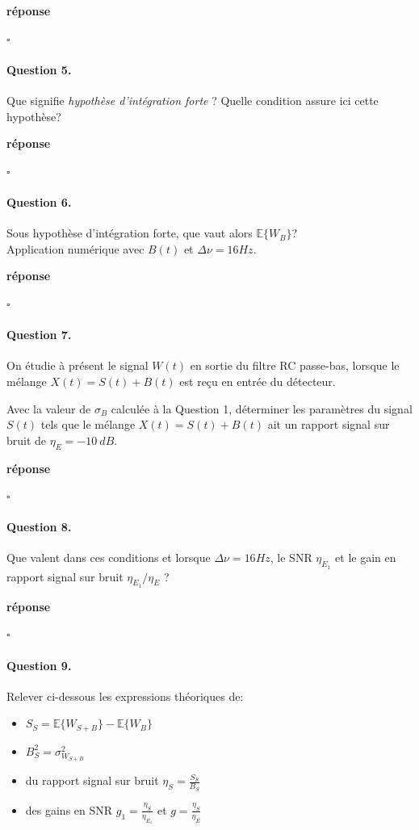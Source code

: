 \documentclass{article}
\newcommand{\dnu}{16}
\newcommand{\debutrep}[1]{\color{blue}\begin{center} \hrulefill \textbf{ #1 } \hrulefill \end{center} }
\newcommand{\finrep}{\vspace*{5mm}\hfill $\square$\color{black}\vspace*{5mm}}
\begin{document}
\debutrep{réponse}

\finrep

\paragraph{Question 5.}
Que signifie {\em hypothèse d'intégration forte} ? Quelle condition assure ici cette hypothèse?

\debutrep{réponse}

\finrep

 \paragraph{Question 6.}
Sous hypothèse d'intégration forte, que vaut  alors $\mathbb{E}\{W_B\}$? \\
Application numérique avec $B(t)$ et $\Delta\nu = \dnu Hz$.

\debutrep{réponse}

\finrep

\paragraph{Question 7.}
On étudie à présent le signal $W(t)$ en sortie du filtre RC passe-bas, lorsque le mélange $X(t) = S(t) + B(t)$ est reçu en entrée du détecteur.

Avec la valeur de $\sigma_B$ calculée à la Question 1, déterminer les paramètres du signal $S(t)$ tels que le mélange $X(t) = S(t)+B(t)$ ait un rapport signal sur bruit de $\eta_E = -10~dB$. 

\debutrep{réponse}

\finrep

 \paragraph{Question 8.}
Que valent dans ces conditions et lorsque $\Delta\nu=\dnu Hz$, le SNR $\eta_{E_1}$ et le gain en rapport signal sur bruit $\eta_{E_1}/\eta_E$ ?

\debutrep{réponse}

\finrep

 \paragraph{Question 9.}
Relever ci-dessous les expressions théoriques de:\\
\begin{itemize}
\itemsep = 2mm
\item $S_S = \mathbb{E}\{W_{S+B}\} - \mathbb{E}\{W_{B}\} $
\item $B_S^2 = \sigma_{W_{S+B}}^2$
\item du rapport signal sur bruit $\eta_S = \frac{S_S}{B_S}$
\item des gains en SNR $g_1 =\frac{\eta_S}{\eta_{E_1}}$ et $g = \frac{\eta_S}{\eta_E}$
\end{itemize}
\end{document}
